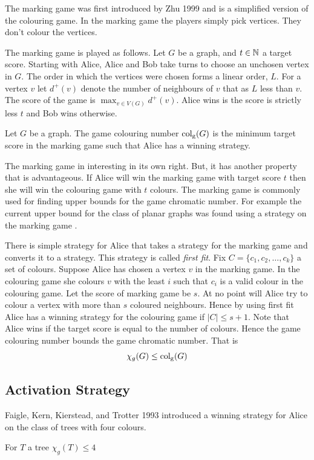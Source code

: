 The marking game was first introduced by Zhu 1999 \cite{Zhu1999} and is a simplified version of the colouring game. In the marking game the players simply pick vertices. They don't colour the vertices. 

The marking game is played as follows. Let $G$ be a graph, and $t\in\mathbb{N}$ a target score. Starting with Alice, Alice and Bob take turns to choose an unchosen vertex in $G$. The order in which the vertices were chosen forms a linear order, $L$. For a vertex $v$ let $d^+(v)$ denote the number of neighbours of $v$ that as $L$ less than $v$. The score of the game is $\max_{v\in V(G)}d^+(v)$. Alice wins is the score is strictly less $t$ and Bob wins otherwise. 
%
\begin{definition}
    Let $G$ be a graph. The game colouring number $\operatorname{col_g}(G)$ is the minimum target score in the marking game such that Alice has a winning strategy. 
\end{definition}
%

The marking game in interesting in its own right. But, it has another property that is advantageous. If Alice will win the marking game with target score $t$ then she will win the colouring game with $t$ colours. The marking game is commonly used for finding upper bounds for the game chromatic number. For example the current upper bound for the class of planar graphs was found using a strategy on the marking game \cite{Zhu2008}.

There is simple strategy for Alice that takes a strategy for the marking game and converts it to a strategy. This strategy is called \textit{first fit}. Fix $C=\{c_1,c_2,\dots,c_k\}$ a set of colours. Suppose Alice has chosen a vertex $v$ in the marking game. In the colouring game she colours $v$ with the least $i$ such that $c_i$ is a valid colour in the colouring game. Let the score of marking game be $s$. At no point will Alice try to colour a vertex with more than $s$ coloured neighbours. Hence by using first fit Alice has a winning strategy for the colouring game if $|C|\leq s+1$. Note that Alice wins if the target score is equal to the number of colours. Hence the game colouring number bounds the game chromatic number. That is 
%
\[\chi_g(G)\leq\operatorname{col_g}(G)\]

\subsection{Activation Strategy}

Faigle, Kern, Kierstead, and Trotter 1993 \cite{faKeKiTr1993} introduced a winning strategy for Alice on the class of trees with four colours. 
\begin{theorem}\label{thm:colTreeleq4}
    For $T$ a tree $\chi_g(T) \leq 4$
\end{theorem}


